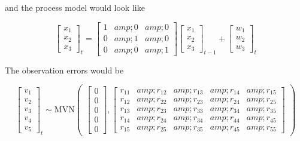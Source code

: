 \documentclass[
  12pt,
]{book}
\begin{document}
and the process model would look like

{\[\begin{equation}
\begin{bmatrix}
    x_{1} \\
    x_{2} \\
    x_{3} \end{bmatrix}_t = 
 \begin{bmatrix}
    1&amp;0&amp;0 \\
    0&amp;1&amp;0 \\
    0&amp;0&amp;1 \end{bmatrix} 
 \begin{bmatrix}
    x_{1}\\
    x_{2}\\
    x_{3}\end{bmatrix}_{t-1} +
 \begin{bmatrix}
    w_{1} \\
    w_{2} \\
    w_{3} \end{bmatrix}_t 
\label{eq:tempate2-x}
\end{equation}\]}

The observation errors would be

{\[\begin{equation}
\begin{bmatrix}
    v_{1} \\
    v_{2} \\
    v_{3} \\
    v_{4} \\
    v_{5} \end{bmatrix}_t 
 \sim \text{MVN} \begin{pmatrix}
    \begin{bmatrix}
    0 \\
    0 \\
    0 \\
    0 \\
    0 \end{bmatrix},
 \begin{bmatrix}
    r_{11}&amp;r_{12}&amp;r_{13}&amp;r_{14}&amp;r_{15}\\
    r_{12}&amp;r_{22}&amp;r_{23}&amp;r_{24}&amp;r_{25}\\
    r_{13}&amp;r_{23}&amp;r_{33}&amp;r_{34}&amp;r_{35}\\
    r_{14}&amp;r_{24}&amp;r_{34}&amp;r_{44}&amp;r_{45}\\
    r_{15}&amp;r_{25}&amp;r_{35}&amp;r_{45}&amp;r_{55}\end{bmatrix}
\end{pmatrix}
\label{eq:template2-oe}
\end{equation}\]}
\end{document}

